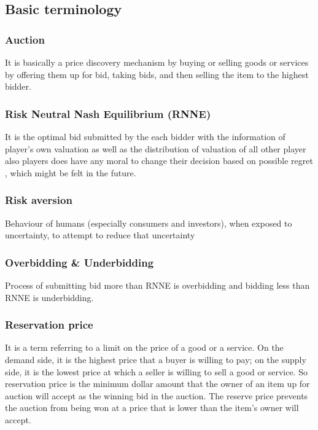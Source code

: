 \documentclass[10pt,a4paper,oneside]{report}
\begin{document}
	\subsection{Basic terminology}
		\subsubsection{Auction}
		It is basically a price discovery mechanism by buying or selling goods or services by offering them up for bid, taking bids, and then selling the item to the highest bidder.

		\subsubsection{Risk Neutral Nash Equilibrium (RNNE)} It is the optimal bid submitted by the each bidder with the information of player's own valuation as well as the distribution of valuation of all other player also players does have any moral to change their decision based on possible regret , which might be felt in the future.

		\subsubsection{Risk aversion} Behaviour of humans (especially consumers and investors), when exposed to uncertainty, to attempt to reduce that uncertainty

		\subsubsection{Overbidding \& Underbidding}
 Process of submitting bid more than RNNE is overbidding and bidding less than RNNE is underbidding. 
		
		\subsubsection{Reservation price} It is a term referring to a limit on the price of a good or a service. On the demand side, it is the highest price that a buyer is willing to pay; on the supply side, it is the lowest price at which a seller is willing to sell a good or service. So reservation price is the minimum dollar amount that the owner of an item up for auction will accept as the winning bid in the auction. The reserve price prevents the auction from being won at a price that is lower than the item's owner will accept.
\end{document}
